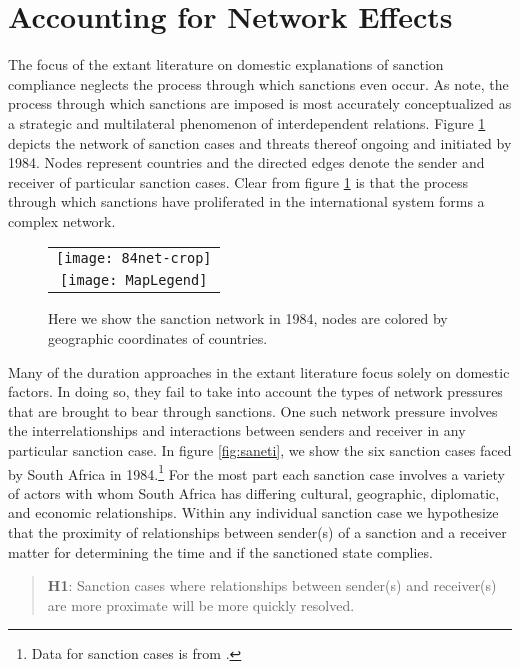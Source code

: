 \section*{Accounting for Network Effects}
\label{neteffects}

The focus of the extant literature on domestic explanations of sanction compliance neglects the process through which sanctions even occur. As \citet{cranmer2014reciprocity} note, the process through which sanctions are imposed is most accurately conceptualized as a strategic and multilateral phenomenon of interdependent relations. Figure \ref{fig:spaghetti} depicts the network of sanction cases and threats thereof ongoing and initiated by 1984. Nodes represent countries and the directed edges denote the sender and receiver of particular sanction cases. Clear from figure \ref{fig:spaghetti} is that the process through which sanctions have proliferated in the international system forms a complex network. 

\begin{figure}[ht]
  \centering
  \begin{tabular}{c}
	  \texttt{[image: 84net-crop]} \\
	  \texttt{[image: MapLegend]}
  \end{tabular}
  \caption{Here we show the sanction network in 1984, nodes are colored by geographic coordinates of countries.}
  \label{fig:spaghetti}
\end{figure}
\FloatBarrier

Many of the duration approaches in the extant literature focus solely on domestic factors. In doing so, they fail to take into account the types of network pressures that are brought to bear through sanctions. One such network pressure involves the interrelationships and interactions between senders and receiver in any particular sanction case. In figure \ref{fig:saneti}, we show the six sanction cases faced by South Africa in 1984.\footnote{Data for sanction cases is from \citet{morgan2009threat}.} For the most part each sanction case involves a variety of actors with whom South Africa has differing cultural, geographic, diplomatic, and economic relationships. Within any individual sanction case we hypothesize that the proximity of relationships between sender(s) of a sanction and a receiver matter for determining the time and if the sanctioned state complies. 

\begin{quote}
	\textbf{H1}: Sanction cases where relationships between sender(s) and receiver(s) are more proximate will be more quickly resolved.
\end{quote}

